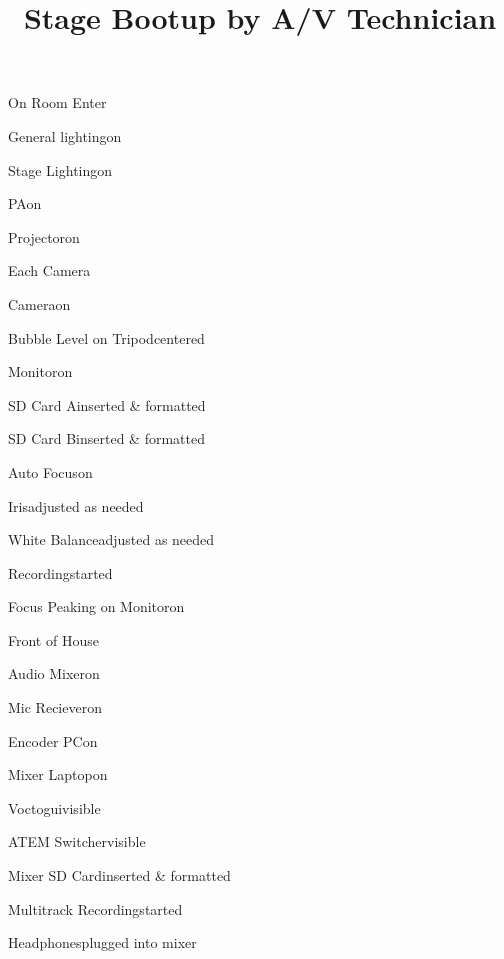 \def\papersize{4}




\title{Stage Bootup by A/V Technician}

\begin{checklist}{On Room Enter}
  \item{General lighting}{on}
  \item{Stage Lighting}{on}
  \item{PA}{on}
  \item{Projector}{on}
\end{checklist}

\begin{checklist}{Each Camera}
  \item{Camera}{on}
  \item{Bubble Level on Tripod}{centered}
  \item{Monitor}{on}
  \item{SD Card A}{inserted \& formatted}
  \item{SD Card B}{inserted \& formatted}
  \item{Auto Focus}{on}
  \item{Iris}{adjusted as needed}
  \item{White Balance}{adjusted as needed}
  \item{Recording}{started}
  \item{Focus Peaking on Monitor}{on}
\end{checklist}

\begin{checklist}{Front of House}
  \item{Audio Mixer}{on}
  \item{Mic Reciever}{on}
  \item{Encoder PC}{on}
  \item{Mixer Laptop}{on}
  \item{Voctogui}{visible}
  \item{ATEM Switcher}{visible}
  \item{Mixer SD Card}{inserted \& formatted}
  \item{Multitrack Recording}{started}
  \item{Headphones}{plugged into mixer}
\end{checklist}

